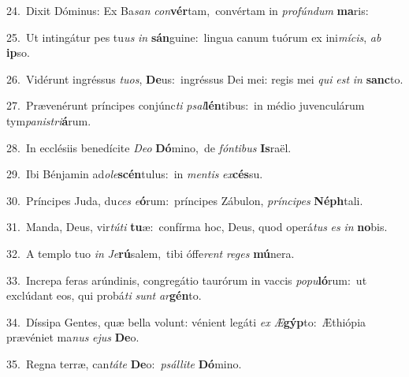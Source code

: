 {\numbfont\textcolor{\numbcolor}{24.}}~Dixit Dóminus: Ex Ba\textit{san} \textit{con}\-\textbf{vér}tam,~\star convértam in \textit{pro}\-\textit{fún}\textit{dum} \textbf{ma}\-ris:\par
{\numbfont\textcolor{\numbcolor}{25.}}~Ut intingátur pes tu\textit{us} \textit{in} \textbf{sán}\-guine:~\star lingua canum tuórum ex ini\-\textit{mí}\-\textit{cis}, \textit{ab} \textbf{ip}\-so.\par
{\numbfont\textcolor{\numbcolor}{26.}}~Vidérunt ingréssus \textit{tu}\-\textit{os}, \textbf{De}\-us:~\star ingréssus Dei mei: regis mei \textit{qui} \textit{est} \textit{in} \textbf{sanc}\-to.\par
{\numbfont\textcolor{\numbcolor}{27.}}~Prævenérunt príncipes conjúnc\textit{ti} \textit{psal}\-\textbf{lén}tibus:~\star in médio juvenculárum tym\-\textit{pa}\-\textit{nis}\textit{tri}\textbf{á}rum.\par
{\numbfont\textcolor{\numbcolor}{28.}}~In ecclésiis benedícite \textit{De}\-\textit{o} \textbf{Dó}\-mino,~\star de \textit{fón}\-\textit{ti}\textit{bus} \textbf{Is}\-raël.\par
{\numbfont\textcolor{\numbcolor}{29.}}~Ibi Bénjamin ad\-\textit{o}\-\textit{le}\textbf{scén}tulus:~\star in \textit{men}\-\textit{tis} \textit{ex}\-\textbf{cés}su.\par
{\numbfont\textcolor{\numbcolor}{30.}}~Príncipes Juda, du\textit{ces} \textit{e}\-\textbf{ó}rum:~\star príncipes Zábulon, \textit{prín}\-\textit{ci}\textit{pes} \textbf{Néph}\-tali.\par
{\numbfont\textcolor{\numbcolor}{31.}}~Manda, Deus, vir\-\textit{tú}\-\textit{ti} \textbf{tu}\-æ:~\star confírma hoc, Deus, quod operá\textit{tus} \textit{es} \textit{in} \textbf{no}\-bis.\par
{\numbfont\textcolor{\numbcolor}{32.}}~A templo tuo \textit{in} \textit{Je}\-\textbf{rú}salem,~\star tibi óffe\textit{rent} \textit{re}\-\textit{ges} \textbf{mú}\-nera.\par
{\numbfont\textcolor{\numbcolor}{33.}}~Increpa feras arúndinis, congregátio taurórum in vaccis \textit{po}\-\textit{pu}\textbf{ló}rum:~\star ut exclúdant eos, qui probá\textit{ti} \textit{sunt} \textit{ar}\-\textbf{gén}to.\par
{\numbfont\textcolor{\numbcolor}{34.}}~Díssipa Gentes, quæ bella volunt: vénient legáti \textit{ex} \textit{Æ}\-\textbf{gýp}to:~\star Æthiópia prævéniet ma\textit{nus} \textit{e}\-\textit{jus} \textbf{De}\-o.\par
{\numbfont\textcolor{\numbcolor}{35.}}~Regna terræ, can\-\textit{tá}\-\textit{te} \textbf{De}\-o:~\star \textit{psál}\-\textit{li}\textit{te} \textbf{Dó}\-mino.\par
